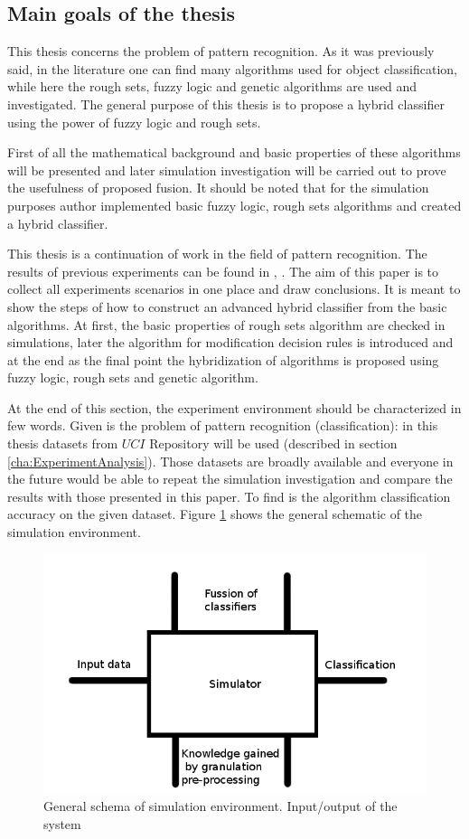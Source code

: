 \subsection{Main goals of the  thesis}
This thesis concerns the problem of pattern recognition. As it was previously
said, in the literature one can find many algorithms used for object
classification, while here the rough sets, fuzzy logic and genetic algorithms are used 
and investigated. The general purpose of this thesis is to propose a hybrid
classifier using the power of fuzzy logic and rough sets.

First of all the mathematical background and basic properties of these algorithms 
will be presented and later simulation investigation will be carried out to prove 
the usefulness of proposed fusion. It should be noted that for the simulation purposes author
implemented basic fuzzy logic, rough sets algorithms and created a hybrid
classifier.

This thesis is a continuation of work in the field of pattern recognition.
The results of previous experiments can be found in \cite{bib34}, \cite{bib35}. 
The aim of this paper is to collect all experiments scenarios in one place and draw
conclusions. It is meant to show the steps of how to construct an advanced hybrid
classifier from the basic algorithms. At first, the basic properties of rough
sets algorithm are checked in simulations, later the algorithm for 
modification decision rules is introduced and at the end as the final point
the hybridization of algorithms is proposed using fuzzy logic, rough sets and
genetic algorithm.

At the end of this section, the experiment environment should be characterized in
few words. Given is the problem of pattern recognition (classification): in
this thesis datasets from $UCI$ Repository will be used (described in section
\ref{cha:ExperimentAnalysis}). Those datasets are broadly available and everyone in the
future would be able to repeat the simulation investigation and compare the
results with those presented in this paper. To find is the algorithm classification accuracy on the given dataset.
Figure \ref{fig:input_output} shows the general schematic of the simulation
environment.
\begin{figure}[H]
    \begin{center}
        \includegraphics[width=\textwidth, height=0.5\textwidth]{fig/schema.png}
    \end{center}
    \caption{General schema of simulation environment. Input/output of the
    system}
    \label{fig:input_output}
\end{figure}

